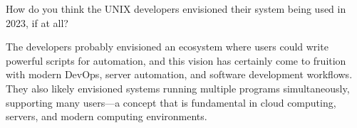 \documentclass[a4paper]{article}
\begin{document}
\begin{Exercise}
    How do you think the UNIX developers envisioned their system being used in 2023, if at all?
\end{Exercise}
\begin{Solution}
    The developers probably envisioned an ecosystem where users could write powerful scripts for automation, and this vision has certainly come to fruition with modern DevOps, server automation, and software development workflows. They also likely envisioned systems running multiple programs simultaneously, supporting many users—a concept that is fundamental in cloud computing, servers, and modern computing environments.
\end{Solution}
\end{document}
